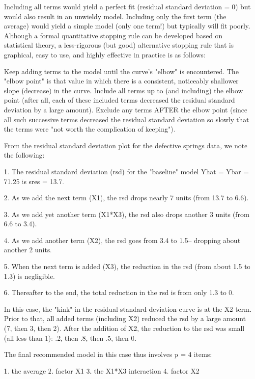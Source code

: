 Including all terms would yield a perfect fit
(residual standard deviation = 0) but would also
result in an unwieldy model.  Including only the
first term (the average) would yield a simple
model (only one term!) but typically will fit
poorly.  Although a formal quantitative stopping
rule can be developed based on statistical theory,
a less-rigorous (but good) alternative stopping rule
that is graphical, easy to use, and highly
effective in practice is as follows:

   Keep adding terms to the model until the curve's
   "elbow" is encountered.  The "elbow point" is that
   value in which there is a consistent, noticeably
   shallower slope (decrease) in the curve.  Include
   all terms up to (and including) the elbow point
   (after all, each of these included terms decreased
   the residual standard deviation by a large
   amount).  Exclude any terms AFTER the elbow point
   (since all such successive terms decreased the
   residual standard deviation so slowly that the
   terms were "not worth the complication of
   keeping").

From the residual standard deviation plot for the
defective springs data, we note the following:

   1. The residual standard deviation (rsd) for
      the "baseline" model Yhat = Ybar = 71.25 is
      sres = 13.7.

   2. As we add the next term (X1), the rsd drops
      nearly 7 units (from 13.7 to 6.6).

   3. As we add yet another term (X1*X3), the rsd
      also drops another 3 units (from 6.6 to
      3.4).

   4. As we add another term (X2), the rsd goes
      from 3.4 to 1.5-- dropping about another 2
      units.

   5. When the next term is added (X3), the
      reduction in the rsd (from about 1.5 to 1.3)
      is negligible.

   6. Thereafter to the end, the total reduction
      in the rsd is from only 1.3 to 0.

In this case, the "kink" in the residual standard
deviation curve is at the X2 term.  Prior to that,
all added terms (including X2) reduced the rsd by
a large amount (7, then 3, then 2).  After the
addition of X2, the reduction to the rsd was small
(all less than 1): .2, then .8, then .5, then 0.

The final recommended model in this case thus
involves p = 4 items:

   1. the average
   2. factor X1
   3. the X1*X3 interaction
   4. factor X2

